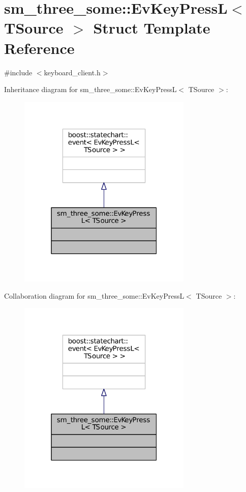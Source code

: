 \hypertarget{structsm__three__some_1_1EvKeyPressL}{}\section{sm\+\_\+three\+\_\+some\+:\+:Ev\+Key\+PressL$<$ T\+Source $>$ Struct Template Reference}
\label{structsm__three__some_1_1EvKeyPressL}


{\ttfamily \#include $<$keyboard\+\_\+client.\+h$>$}



Inheritance diagram for sm\+\_\+three\+\_\+some\+:\+:Ev\+Key\+PressL$<$ T\+Source $>$\+:
\nopagebreak
\begin{figure}[H]
\begin{center}
\leavevmode
\includegraphics[width=235pt]{structsm__three__some_1_1EvKeyPressL__inherit__graph}
\end{center}
\end{figure}


Collaboration diagram for sm\+\_\+three\+\_\+some\+:\+:Ev\+Key\+PressL$<$ T\+Source $>$\+:
\nopagebreak
\begin{figure}[H]
\begin{center}
\leavevmode
\includegraphics[width=235pt]{structsm__three__some_1_1EvKeyPressL__coll__graph}
\end{center}
\end{figure}


